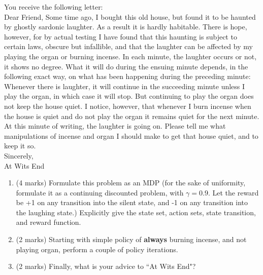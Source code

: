 \documentclass[addpoints,12pt,solution]{exam}
\begin{document}
\begin{questions}
 You receive the following letter:\\
Dear Friend, Some time ago, I bought this old house, but found it to be haunted by
ghostly sardonic laughter. As a result it is hardly habitable. There is hope, however,
for by actual testing I have found that this haunting is subject to certain laws, obscure
but infallible, and that the laughter can be affected by my playing the organ or burning
incense. In each minute, the laughter occurs or not, it shows no degree. What it will
do during the ensuing minute depends, in the following exact way, on what has been
happening during the preceding minute: Whenever there is laughter, it will continue in
the succeeding minute unless I play the organ, in which case it will stop. But continuing
to play the organ does not keep the house quiet. I notice, however, that whenever I
burn incense when the house is quiet and do not play the organ it remains quiet for the
next minute. At this minute of writing, the laughter is going on. Please tell me what
manipulations of incense and organ I should make to get that house quiet, and to keep
it so.\\
Sincerely,\\
At Wits End

\begin{enumerate}[label=(\alph*)]

\item (4 marks) Formulate this problem as an MDP (for the sake of uniformity, formulate it as a
continuing discounted problem, with $\gamma= 0.9$. Let the reward be +1 on any transition
into the silent state, and -1 on any transition into the laughing state.) Explicitly give the
state set, action sets, state transition, and reward function.

\begin{solution}


\end{solution}

\item (2 marks) Starting with simple policy of \textbf{always} burning incense, and not playing organ, perform a couple of policy iterations.

\begin{solution}


\end{solution}
    
\item (2 marks) Finally, what is your advice to ``At Wits End"?

\begin{solution}



\end{solution}
\end{enumerate}
\end{questions}
\end{document}
